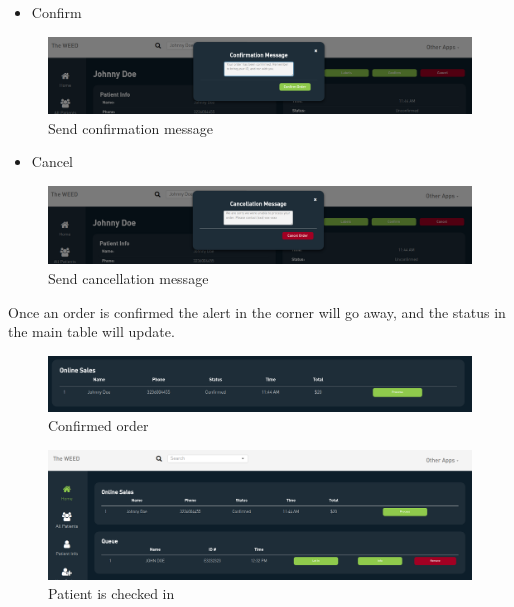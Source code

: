\documentclass[]{book}
\providecommand{\tightlist}{%
  \setlength{\itemsep}{0pt}\setlength{\parskip}{0pt}}
\theoremstyle{definition}
\theoremstyle{definition}
\theoremstyle{definition}
\theoremstyle{remark}
\begin{document}
\begin{itemize}
\tightlist
\item
  Confirm
\end{itemize}

\begin{figure}
\centering
\includegraphics{images/online5.png}
\caption{Send confirmation message}
\end{figure}

\begin{itemize}
\tightlist
\item
  Cancel
\end{itemize}

\begin{figure}
\centering
\includegraphics{images/online6.png}
\caption{Send cancellation message}
\end{figure}

Once an order is confirmed the alert in the corner will go away, and the
status in the main table will update.

\begin{figure}
\centering
\includegraphics{images/online7.png}
\caption{Confirmed order}
\end{figure}

\begin{figure}
\centering
\includegraphics{images/online8.png}
\caption{Patient is checked in}
\end{figure}
\end{document}
